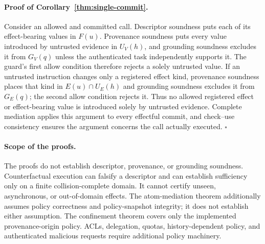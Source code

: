 \documentclass[letterpaper,twocolumn,10pt]{article}
\theoremstyle{definition}
\begin{document}
\paragraph{Proof of Corollary~\ref{thm:single-commit}.}
Consider an allowed and committed call.  Descriptor soundness puts each of its
effect-bearing values in $F(u)$. Provenance soundness puts every value
introduced by untrusted evidence in $U_V(h)$, and grounding soundness excludes
it from $G_V(q)$ unless the authenticated task independently supports it.  The
guard's first allow condition therefore rejects a solely untrusted value.  If
an untrusted instruction changes only a registered effect kind, provenance
soundness places that kind in $E(u)\cap U_E(h)$ and grounding soundness excludes
it from $G_E(q)$; the second allow condition rejects it.  Thus no allowed
registered effect or effect-bearing value is introduced solely by untrusted
evidence.
Complete mediation applies this argument to every effectful commit, and
check--use consistency ensures the argument concerns the call actually
executed. \hfill$\square$

\paragraph{Scope of the proofs.}
The proofs do not establish descriptor, provenance, or grounding soundness.
Counterfactual
execution can falsify a descriptor and can establish sufficiency only on a
finite collision-complete domain. It cannot certify unseen, asynchronous, or
out-of-domain effects.  The atom-mediation theorem additionally assumes policy
correctness and policy-snapshot integrity; it does not establish either
assumption.  The confinement theorem
covers only the implemented provenance-origin policy. ACLs, delegation,
quotas, history-dependent policy,
and authenticated malicious requests require additional policy machinery.
\end{document}
